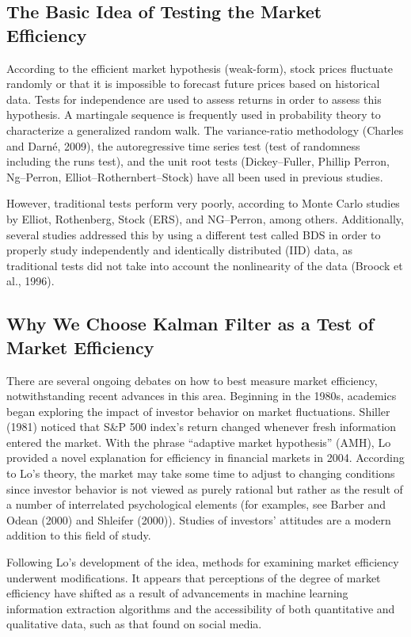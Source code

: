 \subsection{The Basic Idea of Testing the Market Efficiency}
According to the efficient market hypothesis (weak-form), stock prices fluctuate randomly or that it is impossible to forecast future prices based on historical data. Tests for independence are used to assess returns in order to assess this hypothesis. A martingale sequence is frequently used in probability theory to characterize a generalized random walk. The variance-ratio methodology (Charles and Darné, 2009\cite{Charles2009}), the autoregressive time series test (test of randomness including the runs test), and the unit root tests (Dickey–Fuller, Phillip Perron, Ng–Perron, Elliot–Rothernbert–Stock) have all been used in previous studies. 


However, traditional tests perform very poorly, according to Monte Carlo studies by Elliot, Rothenberg, Stock (ERS), and NG–Perron, among others. Additionally, several studies addressed this by using a different test called BDS in order to properly study independently and identically distributed (IID) data, as traditional tests did not take into account the nonlinearity of the data (Broock et al., 1996\cite{Broock1996}).

\subsection{Why We Choose Kalman Filter as a Test of Market Efficiency}
There are several ongoing debates on how to best measure market efficiency, notwithstanding recent advances in this area. Beginning in the 1980s, academics began exploring the impact of investor behavior on market fluctuations. Shiller (1981)\cite{Shiller1981} noticed that S\&P 500 index's return changed whenever fresh information entered the market. With the phrase ``adaptive market hypothesis'' (AMH), Lo provided a novel explanation for efficiency in financial markets in 2004. According to Lo's theory, the market may take some time to adjust to changing conditions since investor behavior is not viewed as purely rational but rather as the result of a number of interrelated psychological elements (for examples, see Barber and Odean (2000)\cite{Barber2000} and Shleifer (2000)\cite{Shleifer2000}). Studies of investors' attitudes are a modern addition to this field of study.

Following Lo's development of the idea, methods for examining market efficiency underwent modifications. It appears that perceptions of the degree of market efficiency have shifted as a result of advancements in machine learning information extraction algorithms and the accessibility of both quantitative and qualitative data, such as that found on social media. 

